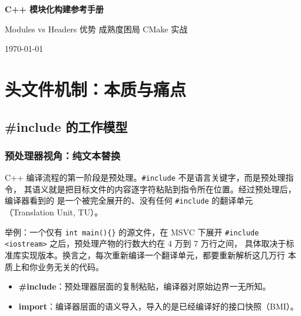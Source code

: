 \documentclass[12pt,a4paper,fontset=fandol]{ctexbook}
\newcommand{\flag}[1]{\texttt{#1}}
\begin{document}
\frontmatter

\begin{titlepage}
\centering
\vspace*{4cm}
{\Huge\bfseries C++ 模块化构建参考手册\par}
\vspace{1cm}
{\LARGE Modules vs Headers \quad 优势 \quad 成熟度困局 \quad CMake 实战\par}
\vfill
{\large \today\par}
\end{titlepage}

\tableofcontents

\mainmatter

\part{头文件机制：本质与痛点}

\chapter{\#include 的工作模型}

\section{预处理器视角：纯文本替换}

C++ 编译流程的第一阶段是预处理。\flag{\#include} 不是语言关键字，而是预处理指令，
其语义就是把目标文件的内容逐字符粘贴到指令所在位置。经过预处理后，编译器看到的
是一个被完全展开的、没有任何 \flag{\#include} 的翻译单元（Translation Unit, TU）。

举例：一个仅有 \texttt{int main()\{\}} 的源文件，在 MSVC 下展开
\texttt{\#include <iostream>} 之后，预处理产物的行数大约在 4 万到 7 万行之间，
具体取决于标准库实现版本。换言之，每次重新编译一个翻译单元，都要重新解析这几万行
本质上和你业务无关的代码。

\begin{compare}[title=文本替换 vs 语义导入]
\begin{itemize}
  \item \textbf{\#include}：预处理器层面的复制粘贴，编译器对原始边界一无所知。
  \item \textbf{import}：编译器层面的语义导入，导入的是已经编译好的接口快照（BMI）。
\end{itemize}
\end{compare}
\end{document}
